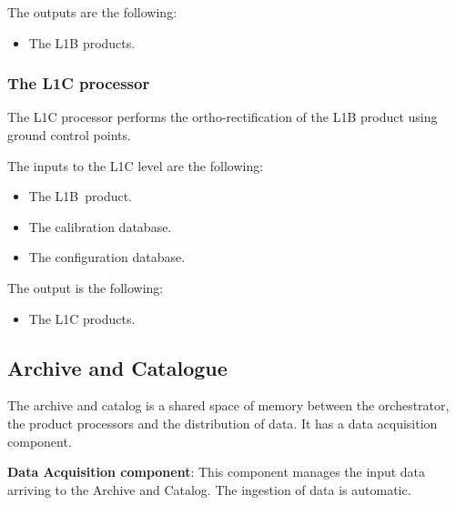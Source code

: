 \documentclass[a4paper]{article}
\newcommand\liststyleLFOxxxii{%
\renewcommand\labelitemi{[F0B7?]}
\renewcommand\labelitemii{o}
\renewcommand\labelitemiii{[F0B7?]}
\renewcommand\labelitemiv{[F0B7?]}
}
\begin{document}
\bigskip

The outputs are the following:

\liststyleLFOxxxii
\begin{itemize}
\item The L1B products.
\end{itemize}

\bigskip

\subsubsection[The L1C processor]{The L1C processor}
\hypertarget{Toc381777216}{}
\bigskip

The L1C processor performs the ortho-rectification of the L1B product
using ground control points.


\bigskip

The inputs to the L1C level are the following:

\liststyleLFOxxxii
\begin{itemize}
\item The L1B\ product.
\item The calibration database.
\item The configuration database.
\end{itemize}

\bigskip

The output is the following:

\liststyleLFOxxxii
\begin{itemize}
\item The L1C products.
\end{itemize}

\bigskip


\bigskip

\subsection[Archive and Catalogue]{Archive and Catalogue}
\hypertarget{Toc381777217}{}
\bigskip

The archive and catalog is a shared space of memory between the
orchestrator, the product processors and the distribution of data. It
has a data acquisition component.


\bigskip

\textbf{Data Acquisition component}: This component manages the input
data arriving to the Archive and Catalog. The ingestion of data is
automatic.\ 


\bigskip
\end{document}
